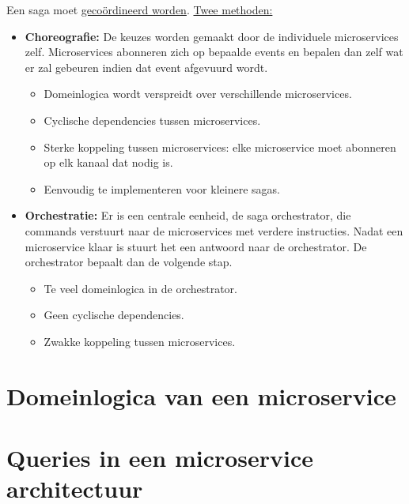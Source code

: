 	Een saga moet \underline{gecoördineerd worden}. \uline{Twee methoden:}
	\begin{itemize}
		\item[\info] \textbf{Choreografie:} De keuzes worden gemaakt door de individuele microservices zelf. Microservices abonneren zich op bepaalde events en bepalen dan zelf wat er zal gebeuren indien dat event afgevuurd wordt. 
		\begin{itemize}
			\item[\alert] Domeinlogica wordt verspreidt over verschillende microservices.
			\item[\alert] Cyclische dependencies tussen microservices.
			\item[\alert] Sterke koppeling tussen microservices: elke microservice moet abonneren op elk kanaal dat nodig is.
			\item[\good] Eenvoudig te implementeren voor kleinere sagas. 
		\end{itemize}
		\item[\info] \textbf{Orchestratie:} Er is een centrale eenheid, de saga orchestrator, die commands verstuurt naar de microservices met verdere instructies. Nadat een microservice klaar is stuurt het een antwoord naar de orchestrator. De orchestrator bepaalt dan de volgende stap. 
		\begin{itemize}
			\item[\alert] Te veel domeinlogica in de orchestrator.
			\item[\good] Geen cyclische dependencies.
			\item[\good] Zwakke koppeling tussen microservices.
		\end{itemize}
	\end{itemize}

	\chapter{Domeinlogica van een microservice}

	\chapter{Queries in een microservice architectuur}

	